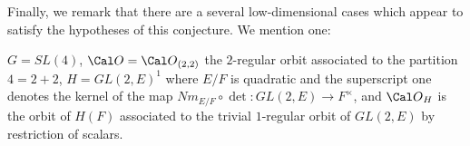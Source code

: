 Finally, we remark that there are a several low-dimensional cases which
appear to
satisfy the hypotheses of this conjecture. We mention one:

$G=SL(4)$, ${\Cal O}={\Cal O}_{(2,2)}$ the $2$-regular orbit associated
to the partition $4=2+2$, $H=GL(2,E)^1$ where $E/F$ is quadratic
and the superscript one denotes the kernel of the map
$Nm_{E/F}\circ \det :GL(2,E)\rightarrow F^{\times}$, and
${\Cal O}_H$ is the orbit of $H(F)$ associated to the
trivial $1$-regular orbit of $GL(2,E)$ by restriction of scalars.


\enddocument



